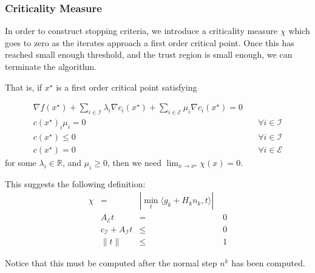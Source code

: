 \documentclass{article}
\DeclareMathOperator*{\argmin}{arg\,min}
\begin{document}




\subsubsection{Criticality Measure}

In order to construct stopping criteria, we introduce a criticality measure $\chi$ which goes to zero as the iterates approach a first order critical point.
Once this has reached small enough threshold, and the trust region is small enough, we can terminate the algorithm.

That is, if $x^{\star}$ is a first order critical point satisfying

\begin{align*}
\nabla f(x^{\star}) + \sum_{i\in\mathcal I} \lambda_i \nabla c_i(x^{\star}) + \sum_{i\in \mathcal E} \mu_i \nabla c_i(x^{\star})  = 0 \\
c(x^{\star})_i \mu_i = 0 & \quad \forall i\in\mathcal I \\
c(x^{\star}) \le 0 & \quad \forall i\in\mathcal I\\
c(x^{\star}) = 0 & \quad \forall i\in\mathcal E
\end{align*}
for some $\lambda_i \in \mathbb R$, and $\mu_i \ge 0$, then we need $\lim_{x\to x^{\star}} \chi(x) = 0$.

This suggests the following definition:
\begin{align}
\label{critical}
\chi & = & |\min_t \langle g_k + H_kn_k, t\rangle| \\
& A_{\mathcal {E}}t &=& \; 0 \\
& c_{\mathcal {I}} + A_{\mathcal {I}}t &\le& \; 0 \\
& \| t \| &\le& \; 1
\end{align}

Notice that this must be computed after the normal step $n^k$ has been computed.
\end{document}
